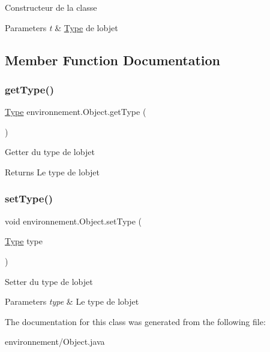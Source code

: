 Constructeur de la classe 
\begin{DoxyParams}{Parameters}
{\em t} & \hyperlink{enumenvironnement_1_1_type}{Type} de l\textquotesingle{}objet \\
\hline
\end{DoxyParams}


\subsection{Member Function Documentation}
\hypertarget{classenvironnement_1_1_object_a12c1066fd1d4b8a10d5a982decc2142f}{}\label{classenvironnement_1_1_object_a12c1066fd1d4b8a10d5a982decc2142f} 
\subsubsection{\texorpdfstring{get\+Type()}{getType()}}
{\footnotesize\ttfamily \hyperlink{enumenvironnement_1_1_type}{Type} environnement.\+Object.\+get\+Type (\begin{DoxyParamCaption}{ }\end{DoxyParamCaption})}

Getter du type de l\textquotesingle{}objet \begin{DoxyReturn}{Returns}
Le type de l\textquotesingle{}objet 
\end{DoxyReturn}
\hypertarget{classenvironnement_1_1_object_aa761d751ee5d7549420d99ffa08ec378}{}\label{classenvironnement_1_1_object_aa761d751ee5d7549420d99ffa08ec378} 
\subsubsection{\texorpdfstring{set\+Type()}{setType()}}
{\footnotesize\ttfamily void environnement.\+Object.\+set\+Type (\begin{DoxyParamCaption}\item[{\hyperlink{enumenvironnement_1_1_type}{Type}}]{type }\end{DoxyParamCaption})}

Setter du type de l\textquotesingle{}objet 
\begin{DoxyParams}{Parameters}
{\em type} & Le type de l\textquotesingle{}objet \\
\hline
\end{DoxyParams}


The documentation for this class was generated from the following file\+:\begin{DoxyCompactItemize}
\item 
environnement/Object.\+java\end{DoxyCompactItemize}
